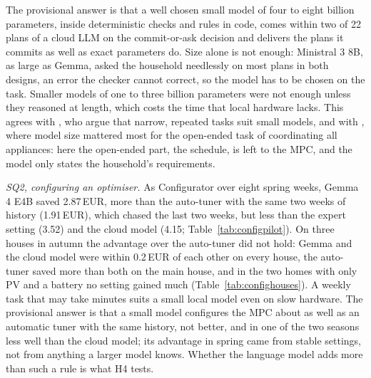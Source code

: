 The provisional answer is that a well chosen small model of four to
eight billion parameters, inside deterministic checks and rules in
code, comes within two of 22 plans of a cloud LLM on the commit-or-ask
decision and delivers the plans it commits as well as exact parameters
do. Size alone is not enough: Ministral 3 8B, as large as Gemma, asked
the household needlessly on most plans in both designs, an error the
checker cannot correct, so the model has to be chosen on the task.
Smaller models of one to three billion parameters were not enough
unless they reasoned at length, which costs the time that local
hardware lacks. This agrees with \textcite{belcak2025}, who argue that
narrow, repeated tasks suit small models, and with
\textcite{elmakroum2026}, where model size mattered most for the
open-ended task of coordinating all appliances: here the open-ended
part, the schedule, is left to the MPC, and the model only states the
household's requirements.

\textit{SQ2, configuring an optimiser.} As Configurator over eight
spring weeks, Gemma 4 E4B saved 2.87\,EUR, more than the auto-tuner
with the same two weeks of history (1.91\,EUR), which chased the last
two weeks, but less than the expert setting (3.52) and the cloud model
(4.15; Table~\ref{tab:configpilot}). On three houses in autumn the
advantage over the auto-tuner did not hold: Gemma and the cloud model
were within 0.2\,EUR of each other on every house, the auto-tuner saved
more than both on the main house, and in the two homes with only PV and
a battery no setting gained much (Table~\ref{tab:confighouses}). A
weekly task that may take minutes suits a small local model even on
slow hardware. The provisional answer is that a small model configures
the MPC about as well as an automatic tuner with the same history, not
better, and in one of the two seasons less well than the cloud model;
its advantage in spring came from stable settings, not from anything a
larger model knows. Whether the language model adds more than such a
rule is what H4 tests.

